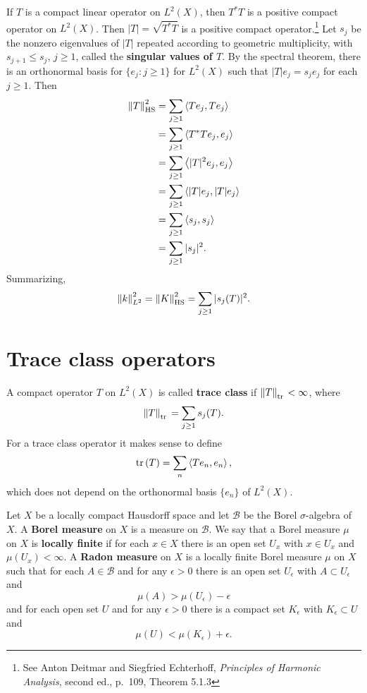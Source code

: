 \documentclass{article}
\newcommand{\inner}[2]{\left\langle #1, #2 \right\rangle}
\newcommand{\tr}{\ensuremath\mathrm{tr}\,}
\newcommand{\HS}{\ensuremath\mathrm{HS}}
\newcommand{\norm}[1]{\left\Vert #1 \right\Vert}
\theoremstyle{definition}
\begin{document}
If $T$ is a compact linear operator on $L^2(X)$, then $T^*T$ is a positive compact operator on $L^2(X)$. 
Then $|T|=\sqrt{T^*T}$ is a positive compact operator.\footnote{See 
Anton Deitmar and Siegfried Echterhoff,
{\em Principles of Harmonic Analysis}, second ed.,
p.~109, Theorem 5.1.3}
Let $s_j$ be the  nonzero eigenvalues of $|T|$ repeated according to geometric
multiplicity, with $s_{j+1} \leq s_j$, $j \geq 1$,
called the \textbf{singular values of $T$}.
By the spectral theorem,  there is an orthonormal basis for $\{e_j: j \geq 1\}$ for $L^2(X)$ such that
$|T|e_j=s_j e_j$ for each $j \geq 1$.
Then
\begin{align*}
\norm{T}_{\HS}^2&=\sum_{j \geq 1} \inner{Te_j}{Te_j}\\
&=\sum_{j \geq 1} \inner{T^*Te_j}{e_j}\\
&=\sum_{j \geq 1} \inner{|T|^2 e_j}{e_j}\\
&=\sum_{j \geq 1} \inner{|T|e_j}{|T|e_j}\\
&= \sum_{j \geq 1} \inner{s_j}{s_j}\\
&= \sum_{j \geq 1} |s_j|^2.
\end{align*}
Summarizing,
\[
\norm{k}_{L^2}^2 = \norm{K}_{\HS}^2 = \sum_{j \geq 1} |s_j(T)|^2.
\]



\section{Trace class operators}
A compact operator $T$ on $L^2(X)$ is called \textbf{trace class} if 
$\norm{T}_{\tr} < \infty$, where
\[
\norm{T}_{\tr} = \sum_{j \geq 1} s_j(T).
\]
For  a trace class operator it makes sense to define
\[
\tr(T) = \sum_n \inner{Te_n}{e_n},
\]
which does not depend on the orthonormal basis $\{e_n\}$ of $L^2(X)$. 


Let $X$ be a locally compact Hausdorff space and let $\mathscr{B}$ be the Borel $\sigma$-algebra of $X$.
A \textbf{Borel measure} on $X$ is a measure on $\mathscr{B}$. We say that a Borel measure $\mu$ on $X$
is \textbf{locally finite} if for each
$x \in X$ there is an open set $U_x$ with $x \in U_x$ and $\mu(U_x)<\infty$. 
A \textbf{Radon measure} on $X$ is a locally finite Borel measure $\mu$ on $X$ such that for
each $A \in \mathscr{B}$ and for any $\epsilon>0$ there is an open set $U_\epsilon$ with $A \subset U_\epsilon$ and
\[
\mu(A)>\mu(U_\epsilon)-\epsilon
\] 
and for each open set $U$ and for any $\epsilon>0$ there is a compact set $K_\epsilon$ with $K_\epsilon \subset U$ and
\[
\mu(U) < \mu(K_\epsilon)+\epsilon.
\]
\end{document}
